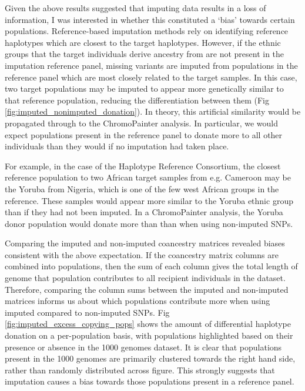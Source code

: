 Given the above results suggested that imputing data results in a loss of information, I was interested in whether this constituted a `bias' towards certain populations. Reference-based imputation methods rely on identifying reference haplotypes which are closest to the target haplotypes. However, if the ethnic groups that the target individuals derive ancestry from are not present in the imputation reference panel, missing variants are imputed from populations in the reference panel which are most closely related to the target samples. In this case, two target populations may be imputed to appear more genetically similar to that reference population, reducing the differentiation between them (Fig \ref{fig:imputed_nonimputed_donation}). In theory, this artificial similarity would be propagated through to the ChromoPainter analysis. In particular, we would expect populations present in the reference panel to donate more to all other individuals than they would if no imputation had taken place.  

For example, in the case of the Haplotype Reference Consortium, the closest reference population to two African target samples from e.g. Cameroon may be the Yoruba from Nigeria, which is one of the few west African groups in the reference. These samples would appear more similar to the Yoruba ethnic group than if they had not been imputed. In a ChromoPainter analysis, the Yoruba donor population would donate more than than when using non-imputed SNPs.    

Comparing the imputed and non-imputed coancestry matrices revealed biases consistent with the above expectation. If the coancestry matrix columns are combined into populations, then the sum of each column gives the total length of genome that population contributes to all recipient individuals in the dataset. Therefore, comparing the column sums between the imputed and non-imputed matrices informs us about which populations contribute more when using imputed compared to non-imputed SNPs. Fig \ref{fig:imputed_excess_copying_pops} shows the amount of differential haplotype donation on a per-population basis, with populations highlighted based on their presence or absence in the 1000 genomes dataset. It is clear that populations present in the 1000 genomes are primarily clustered towards the right hand side, rather than randomly distributed across figure. This strongly suggests that imputation causes a bias towards those populations present in a reference panel. 

